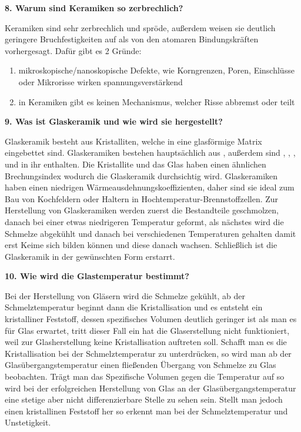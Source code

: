 \noindent\textbf{8. Warum sind Keramiken so zerbrechlich?}\\
\begin{addmargin}[25pt]{0pt}
Keramiken sind sehr zerbrechlich und spröde, außerdem weisen sie deutlich geringere Bruchfestigkeiten auf als von den atomaren Bindungskräften vorhergesagt. Dafür gibt es 2 Gründe:\\
\begin{enumerate}
    \item mikroskopische/nanoskopische Defekte, wie Korngrenzen, Poren, Einschlüsse oder Mikrorisse wirken spannungsverstärkend
    \item in Keramiken gibt es keinen Mechanismus, welcher Risse abbremst oder teilt 
\end{enumerate}
\end{addmargin}

\noindent\textbf{9. Was ist Glaskeramik und wie wird sie hergestellt?}\\
\begin{addmargin}[25pt]{0pt}
Glaskeramik besteht aus Kristalliten, welche in eine glasförmige Matrix eingebettet sind. Glaskeramiken bestehen hauptsächlich aus , außerdem sind , , ,  und  in ihr enthalten. Die Kristallite und das Glas haben einen ähnlichen Brechungsindex wodurch die Glaskeramik durchsichtig wird. Glaskeramiken haben einen niedrigen Wärmeausdehnungskoeffizienten, daher sind sie ideal zum Bau von Kochfeldern oder Haltern in Hochtemperatur-Brennstoffzellen. Zur Herstellung von Glaskeramiken werden zuerst die Bestandteile geschmolzen, danach bei einer etwas niedrigeren Temperatur geformt, als nächstes wird die Schmelze abgekühlt und danach bei verschiedenen Temperaturen gehalten damit erst Keime sich bilden können und diese danach wachsen. Schließlich ist die Glaskeramik in der gewünschten Form erstarrt. \\
\end{addmargin}


\noindent\textbf{10. Wie wird die Glastemperatur bestimmt?}\\
\begin{addmargin}[25pt]{0pt}
Bei der Herstellung von Gläsern wird die Schmelze gekühlt, ab der Schmelztemperatur beginnt dann die Kristallisation und es entsteht ein kristalliner Feststoff, dessen spezifisches Volumen deutlich geringer ist als man es für Glas erwartet, tritt dieser Fall ein hat die Glaserstellung nicht funktioniert, weil zur Glasherstellung keine Kristallisation auftreten soll. Schafft man es die Kristallisation bei der Schmelztemperatur zu unterdrücken, so wird man ab der Glasübergangstemperatur einen fließenden Übergang von Schmelze zu Glas beobachten. Trägt man das Spezifische Volumen gegen die Temperatur auf so wird bei der erfolgreichen Herstellung von Glas an der Glasübergangstemperatur eine stetige aber nicht differenzierbare Stelle zu sehen sein. Stellt man jedoch einen kristallinen Feststoff her so erkennt man bei der Schmelztemperatur und Unstetigkeit. \\
\end{addmargin}

